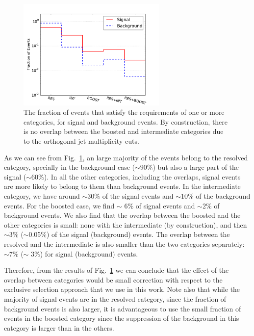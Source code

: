 \begin{figure}[t]
\begin{center}
\includegraphics[width=0.65\textwidth]{plots/overlap_categories_C1.pdf}
\caption{\small The fraction of events that satisfy the requirements
  of one or more categories, for signal and background events.
  By construction, there is no overlap between the boosted
  and intermediate categories due to the
   orthogonal jet multiplicity cuts.
}
\label{fig:categorisationHisto}
\end{center}
\end{figure}

As we can see from Fig.~\ref{fig:categorisationHisto}, an large majority of the events
belong to the resolved category, specially in the background case ($\sim 90\%$) but
also a large part of the signal ($\sim 60\%$).
%
In all the other categories, including
the overlaps, signal events are more likely to belong to them than
background events.
%
In the intermediate category, we have around $\sim$30\% of the signal
events and $\sim$10\% of the background events.
%
For the boosted case, we find $\sim$ 6\% of signal events and
$\sim$2\% of background events.
%
We also find that the overlap between the boosted and the other categories
is small: none with the intermediate (by construction), and then $\sim$3\%
($\sim$0.05\%) of the signal (background) events.
%
The overlap between the resolved and the intermediate is also smaller
than the two categories separately: $\sim$7\%
($\sim$ 3\%) for signal (background) events.

Therefore, from the results of Fig.~\ref{fig:categorisationHisto}
we can conclude that the effect of the overlap between categories would
be small correction with respect to the exclusive selection approach
that we use in this work.
%
Note also that while the majority of signal events are in the resolved
category, since the fraction of background events is also larger,
it is advantageous to use the small fraction of events in the boosted category
since the suppression of the background in this category is larger
than in the others.

